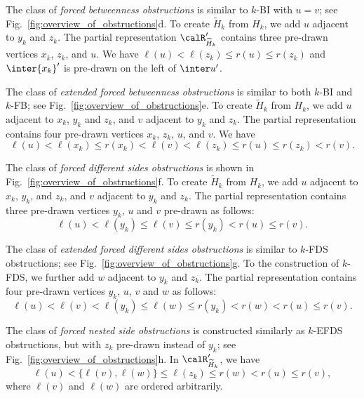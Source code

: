 The class of \emph{forced betweenness obstructions} is similar to $k$-BI with $u=v$; see
Fig.~\ref{fig:overview_of_obstructions}d. To create $\widetilde H_k$ from $H_k$, we add $u$
adjacent to $y_k$ and $z_k$. The partial representation $\calR'_{\widetilde H_k}$ contains three
pre-drawn vertices $x_k$, $z_k$, and $u$.  We have $\ell(u) < \ell(z_k) \le r(u) \le r(z_k)$ and
$\inter{x_k}'$ is pre-drawn on the left of $\inter u'$.

The class of \emph{extended forced betweenness obstructions} is similar to both $k$-BI and
$k$-FB; see Fig.~\ref{fig:overview_of_obstructions}e. To create $\widetilde H_k$ from $H_k$, we add $u$
adjacent to $x_k$, $y_k$ and $z_k$, and $v$ adjacent to $y_k$ and $z_k$. The partial representation
contains four pre-drawn vertices $x_k$, $z_k$, $u$, and $v$.  We have
$$\ell(u) < \ell(x_k) \le r(x_k) < \ell(v) < \ell(z_k) \le r(u) \le r(z_k) < r(v).$$

The class of \emph{forced different sides obstructions} is shown in
Fig.~\ref{fig:overview_of_obstructions}f. To create $\widetilde H_k$ from $H_k$, we add $u$ adjacent
to $x_k$, $y_k$, and $z_k$, and $v$ adjacent to $y_k$ and $z_k$. The partial representation
contains three pre-drawn vertices $y_k$, $u$ and $v$ pre-drawn as follows:
$$\ell(u) < \ell(y_k) \le \ell(v) \le r(y_k) < r(u) \le r(v).$$

The class of \emph{extended forced different sides obstructions} is similar to $k$-FDS
obstructions; see Fig.~\ref{fig:overview_of_obstructions}g. To the construction of
$k$-FDS, we further add $w$ adjacent to $y_k$ and $z_k$.  The partial representation
contains four pre-drawn vertices $y_k$, $u$, $v$ and $w$ as follows:
$$\ell(u) < \ell(v) < \ell(y_k) \le \ell(w) \le r(y_k) < r(w) < r(u) \le r(v).$$

 The class of \emph{forced nested side obstructions} is
constructed similarly as $k$-EFDS obstructions, but with $z_k$ pre-drawn instead of $y_k$; see
Fig.~\ref{fig:overview_of_obstructions}h. In $\calR'_{\widetilde H_k}$, we have
$$\ell(u) < \bigl\{\ell(v), \ell(w)\bigr\} \le \ell(z_k) \le r(w) < r(u) \le r(v),$$
where $\ell(v)$ and $\ell(w)$ are ordered arbitrarily.

